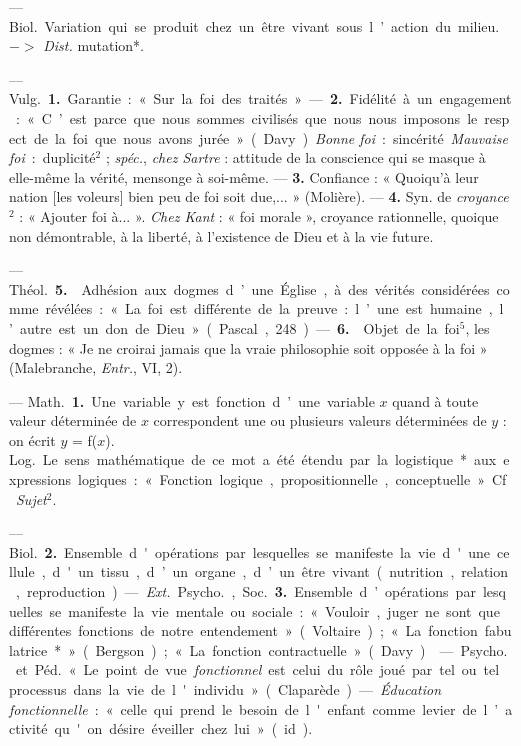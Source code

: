 \begin{itemize}[leftmargin=1cm, label=, itemsep=1pt]
 — \si{Biol.} Variation qui se produit chez un être vivant
sous l’action du milieu. $->$ {\it Dist.} mutation*.

 — \si{Vulg.} {\bf 1.} Garantie : « Sur la
foi des traités ». — {\bf 2.} Fidélité à un
engagement : « C’est parce que nous sommes civilisés que nous nous
imposons le respect de la foi que nous avons jurée » (Davy). {\it Bonne
foi} : sincérité. {\it Mauvaise foi} : duplicité$^2$ ; {\it spéc.},
{\it chez Sartre} : attitude de la conscience qui se masque à elle-même la
vérité, mensonge à soi-même. — {\bf 3.} Confiance : « Quoiqu’à leur nation
[les voleurs] bien peu de foi soit due,... » (Molière).
— {\bf 4.} Syn. de {\it croyance}$^2$ : « Ajouter foi à... ». {\it Chez
Kant} : « foi morale », croyance rationnelle, quoique non
démontrable, à la liberté, à l’existence de Dieu et à la vie future.

— \si{Théol.} {\bf 5.}  Adhésion aux
dogmes d’une Église, à des vérités considérées comme révélées : « La
foi est différente de la preuve : l’une est humaine, l’autre est un don de
Dieu » (Pascal, 248). — {\bf 6.}  Objet
de la foi$^5$, les dogmes : « Je ne croirai jamais que la vraie philosophie
soit opposée à la foi » (Malebranche, {\it Entr.}, VI, 2).

 — \si{Math.} {\bf 1.} Une variable
y est fonction d’une variable $x$ quand
à toute valeur déterminée de $x$ correspondent une ou plusieurs valeurs
déterminées de $y$ : on écrit $y$ = f($x$).
\si{Log.} Le sens mathématique de ce mot a été étendu par la logistique*
aux expressions logiques : « Fonction logique, propositionnelle, conceptuelle. » Cf. {\it Sujet}$^2$.

— \si{Biol.} {\bf 2.} Ensemble d'opérations
par lesquelles se manifeste la vie
d'une cellule, d'un tissu, d’un organe, d’un être vivant (nutrition,
relation, reproduction). — {\it Ext.}
\si{Psycho.}, \si{Soc.} {\bf 3.} Ensemble d’opérations par lesquelles se
manifeste la vie mentale ou sociale : « Vouloir,
juger ne sont que différentes fonctions de notre entendement » (Voltaire); « La fonction fabulatrice* »
(Bergson) ; « La fonction contractuelle » (Davy).

 — \si{Psycho.} et \si{Péd.} « Le
point de vue {\it fonctionnel} est celui du rôle joué par tel ou tel processus
dans la vie de l'individu » (Claparède). — {\it Éducation fonctionnelle} :
« celle qui prend le besoin de l'enfant comme levier de l’activité qu'on
désire éveiller chez lui » (id.).


\end{itemize}
